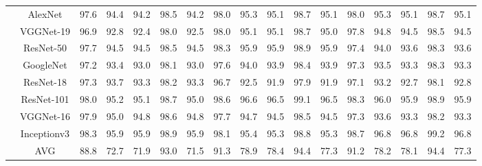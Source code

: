 \documentclass[12pt,italian]{article}
\begin{document}
\begin{tiny}
\begin{longtable}{lcccccccccccccccc}
& AlexNet & 97.6 & 94.4 & 94.2 & 98.5 & 94.2 & 98.0 & 95.3 & 95.1 & 98.7 & 95.1 & 98.0 & 95.3 & 95.1 & 98.7 & 95.1 \\ 
& VGGNet-19 & 96.9 & 92.8 & 92.4 & 98.0 & 92.5 & 98.0 & 95.1 & 95.1 & 98.7 & 95.0 & 97.8 & 94.8 & 94.5 & 98.5 & 94.5 \\ 
& ResNet-50 & 97.7 & 94.5 & 94.5 & 98.5 & 94.5 & 98.3 & 95.9 & 95.9 & 98.9 & 95.9 & 97.4 & 94.0 & 93.6 & 98.3 & 93.6 \\ 
& GoogleNet & 97.2 & 93.4 & 93.0 & 98.1 & 93.0 & 97.6 & 94.0 & 93.9 & 98.4 & 93.9 & 97.3 & 93.5 & 93.3 & 98.3 & 93.3 \\ 
& ResNet-18 & 97.3 & 93.7 & 93.3 & 98.2 & 93.3 & 96.7 & 92.5 & 91.9 & 97.9 & 91.9 & 97.1 & 93.2 & 92.7 & 98.1 & 92.8 \\ 
& ResNet-101 & 98.0 & 95.2 & 95.1 & 98.7 & 95.0 & 98.6 & 96.6 & 96.5 & 99.1 & 96.5 & 98.3 & 96.0 & 95.9 & 98.9 & 95.9 \\ 
& VGGNet-16 & 97.9 & 95.0 & 94.8 & 98.6 & 94.8 & 97.7 & 94.7 & 94.5 & 98.5 & 94.5 & 97.3 & 93.6 & 93.3 & 98.2 & 93.3 \\ 
& Inceptionv3 & 98.3 & 95.9 & 95.9 & 98.9 & 95.9 & 98.1 & 95.4 & 95.3 & 98.8 & 95.3 & 98.7 & 96.8 & 96.8 & 99.2 & 96.8 \\ 
\hline
& AVG & 88.8 & 72.7 & 71.9 & 93.0 & 71.5 & 91.3 & 78.9 & 78.4 & 94.4 & 77.3 & 91.2 & 78.2 & 78.1 & 94.4 & 77.3 \\ 
\hline
\bottomrule
\end{longtable} 

 \pagebreak 
\end{tiny} 
 
\end{document}

